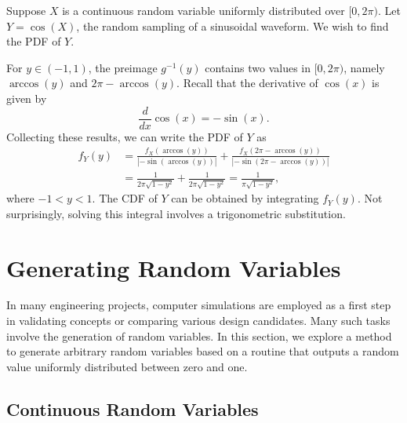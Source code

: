 \begin{example}
Suppose $X$ is a continuous random variable uniformly distributed over $[0, 2 \pi)$.
Let $Y = \cos (X)$, the random sampling of a sinusoidal waveform.
We wish to find the PDF of $Y$.

For $y \in (-1, 1)$, the preimage $g^{-1} (y)$ contains two values in $[0, 2\pi)$, namely $\arccos (y)$ and $2 \pi - \arccos (y)$.
Recall that the derivative of $\cos(x)$ is given by
\begin{equation*}
\frac{d}{dx} \cos (x) = - \sin (x) .
\end{equation*}
Collecting these results, we can write the PDF of $Y$ as
\begin{equation*}
\begin{split}
f_Y (y) &= \frac{f_X( \arccos (y) )}{ \left| - \sin (\arccos (y)) \right|}
+ \frac{f_X( 2 \pi - \arccos (y) )}{ \left| - \sin (2\pi - \arccos (y)) \right| } \\
&= \frac{1}{2 \pi \sqrt{1 - y^2} } + \frac{1}{ 2 \pi \sqrt{ 1 - y^2} }
= \frac{1}{\pi \sqrt{1 - y^2} } ,
\end{split}
\end{equation*}
where $-1 < y < 1$.
The CDF of $Y$ can be obtained by integrating $f_Y (y)$.
Not surprisingly, solving this integral involves a trigonometric substitution.
\end{example}


\section{Generating Random Variables}

In many engineering projects, computer simulations are employed as a first step in validating concepts or comparing various design candidates.
Many such tasks involve the generation of random variables.
In this section, we explore a method to generate arbitrary random variables based on a routine that outputs a random value uniformly distributed between zero and one.

\subsection{Continuous Random Variables}

